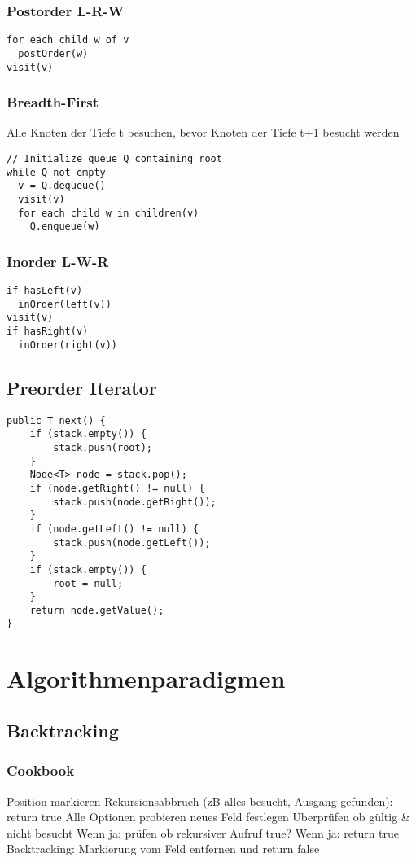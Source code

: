 \begin{multicols*}{4}
		\subsubsection{Postorder L-R-W}
			\begin{lstlisting}
for each child w of v
  postOrder(w)
visit(v)
			\end{lstlisting}
		
		\subsubsection{Breadth-First}
		Alle Knoten der Tiefe t besuchen, bevor Knoten der Tiefe t+1 besucht werden
			\begin{lstlisting}
// Initialize queue Q containing root
while Q not empty
  v = Q.dequeue()
  visit(v)
  for each child w in children(v)
    Q.enqueue(w)
			\end{lstlisting}
		
		\subsubsection{Inorder L-W-R}
			\begin{lstlisting}
if hasLeft(v)
  inOrder(left(v))
visit(v)
if hasRight(v)
  inOrder(right(v))
			\end{lstlisting}

	\subsection{Preorder Iterator}
		\begin{lstlisting}
public T next() {
	if (stack.empty()) {
		stack.push(root);
	}
	Node<T> node = stack.pop();
	if (node.getRight() != null) {
		stack.push(node.getRight());
	}
	if (node.getLeft() != null) {
		stack.push(node.getLeft());
	}
	if (stack.empty()) {
		root = null;
	}
	return node.getValue(); 
}
		\end{lstlisting}

\section{Algorithmenparadigmen}
	\subsection{Backtracking}
		\subsubsection{Cookbook}
			\renewcommand{\outlineii}{enumerate}
			\renewcommand{\outlineiii}{enumerate}
			\begin{outline}
				\1 Position markieren
				\1 Rekursionsabbruch (zB alles besucht, Ausgang gefunden): return true 
				\1 Alle Optionen probieren
					\2 neues Feld festlegen
					\2 Überprüfen ob gültig \& nicht besucht
						\3 Wenn ja: prüfen ob rekursiver Aufruf true? 
							\4 Wenn ja: return true
				\1 Backtracking: Markierung vom Feld entfernen und return false
			\end{outline}
			\renewcommand{\outlineii}{itemize}
			\renewcommand{\outlineiii}{itemize}
		

\end{multicols*}
